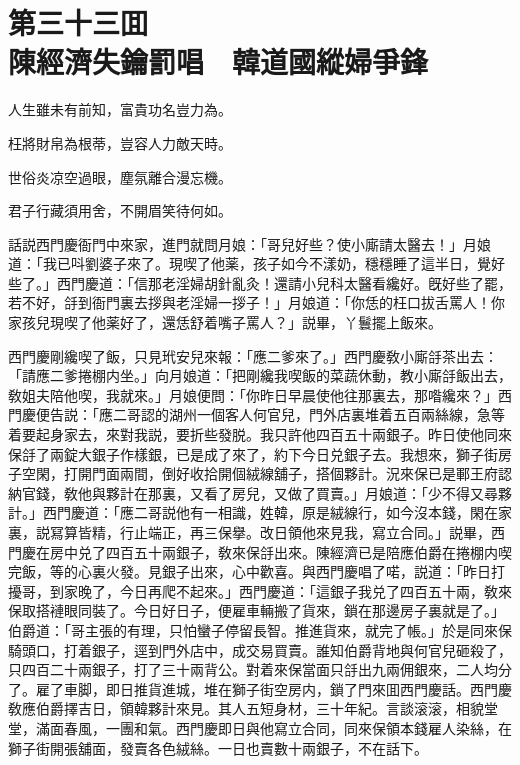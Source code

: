 
\chapter*{第三十三囬　\\陳經濟失鑰罰唱　韓道國縱婦爭鋒}


\begin{myquote}
人生雖未有前知，富貴功名豈力為。

枉將財帛為根蒂，豈容人力敵天時。

世俗炎凉空過眼，塵氛離合漫忘機。

君子行藏須用舍，不開眉笑待何如。
\end{myquote}

話説西門慶衙門中來家，進門就問月娘：「哥兒好些？使小廝請太醫去！」月娘道：「我已呌劉婆子來了。現喫了他薬，孩子如今不漾奶，穩穩睡了這半日，覺好些了。」西門慶道：「信那老淫婦胡針亂灸！還請小兒科太醫看纔好。旣好些了罷，若不好，㧱到衙門裏去拶與老淫婦一拶子！」月娘道：「你恁的枉口拔舌罵人！你家孩兒現喫了他薬好了，還恁舒着嘴子罵人？」説畢，丫鬟擺上飯來。

西門慶剛纔喫了飯，只見玳安兒來報：「應二爹來了。」西門慶敎小廝㧱茶出去：「請應二爹捲棚内坐。」向月娘道：「把剛纔我喫飯的菜蔬休動，教小廝㧱飯出去，敎姐夫陪他喫，我就來。」月娘便問：「你昨日早晨使他往那裏去，那喒纔來？」西門慶便告説：「應二哥認的湖州一個客人何官兒，門外店裏堆着五百兩絲線，急等着要起身家去，來對我説，要折些發脱。我只許他四百五十兩銀子。昨日使他同來保㧱了兩錠大銀子作樣銀，已是成了來了，約下今日兑銀子去。我想來，獅子街房子空閑，打開門面兩間，倒好收拾開個絨線舖子，搭個夥計。況來保已是鄆王府認納官錢，敎他與夥計在那裏，又看了房兒，又做了買賣。」月娘道：「少不得又尋夥計。」西門慶道：「應二哥説他有一相識，姓韓，原是絨線行，如今沒本錢，閑在家裏，説冩算皆精，行止端正，再三保擧。改日領他來見我，寫立合同。」説畢，西門慶在房中兑了四百五十兩銀子，敎來保㧱出來。陳經濟已是陪應伯爵在捲棚内喫完飯，等的心裏火發。見銀子出來，心中歡喜。與西門慶唱了喏，説道：「昨日打擾哥，到家晚了，今日再爬不起來。」西門慶道：「這銀子我兑了四百五十兩，敎來保取搭褳眼同裝了。今日好日子，便雇車輛搬了貨來，鎖在那邊房子裏就是了。」伯爵道：「哥主張的有理，只怕蠻子停留長智。推進貨來，就完了帳。」於是同來保騎頭口，打着銀子，逕到門外店中，成交易買賣。誰知伯爵背地與何官兒砸殺了，只四百二十兩銀子，打了三十兩背公。對着來保當面只㧱出九兩佣銀來，二人均分了。雇了車脚，即日推貨進城，堆在獅子街空房内，鎖了門來囬西門慶話。西門慶敎應伯爵擇吉日，領韓夥計來見。其人五短身材，三十年紀。言談滚滚，相貌堂堂，滿面春風，一團和氣。西門慶即日與他寫立合同，同來保領本錢雇人染絲，在獅子街開張舖面，發賣各色絨絲。一日也賣數十兩銀子，不在話下。

